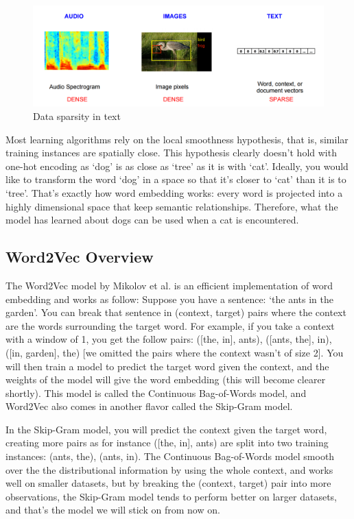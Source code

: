 \begin{figure}[H]
    \centering
    \includegraphics[width=\textwidth]{Images/comparison-text.png}
    \caption{Data sparsity in text \cite{comparison-text}}
    \label{comparison-text}
\end{figure}

Most learning algorithms rely on the local smoothness hypothesis, that is, similar training instances are spatially close. This hypothesis clearly doesn't hold with one-hot encoding as `dog' is as close as `tree' as it is with `cat'. Ideally, you would like to transform the word `dog' in a space so that it's closer to `cat' than it is to `tree'. That's exactly how word embedding works: every word is projected into a highly dimensional space that keep semantic relationships. Therefore, what the model has learned about dogs can be used when a cat is encountered. 

\subsection{Word2Vec Overview}
The Word2Vec model by Mikolov et al. \cite{word2vec} is an efficient implementation of word embedding and works as follow:
Suppose you have a sentence: `the ants in the garden'. You can break that sentence in (context, target) pairs where the context are the words surrounding the target word. For example, if you take a context with a window of 1, you get the follow pairs: ([the, in], ants), ([ants, the], in), ([in, garden], the) [we omitted the pairs where the context wasn't of size 2]. You will then train a model to predict the target word given the context, and the weights of the model will give the word embedding (this will become clearer shortly). This model is called the Continuous Bag-of-Words model, and Word2Vec also comes in another flavor called the Skip-Gram model.

In the Skip-Gram model, you will predict the context given the target word, creating more pairs as for instance ([the, in], ants) are split into two training instances: (ants, the), (ants, in). The Continuous Bag-of-Words model smooth over the the distributional information by using the whole context, and works well on smaller datasets, but by breaking the (context, target) pair into more observations, the Skip-Gram model tends to perform better on larger datasets, and that's the model we will stick on from now on.

